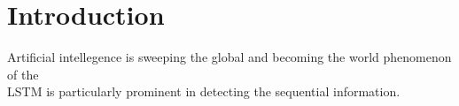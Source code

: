 \section{Introduction}
Artificial intellegence is sweeping the global and becoming the world phenomenon of the 
\\
LSTM is particularly prominent in detecting the sequential information. 